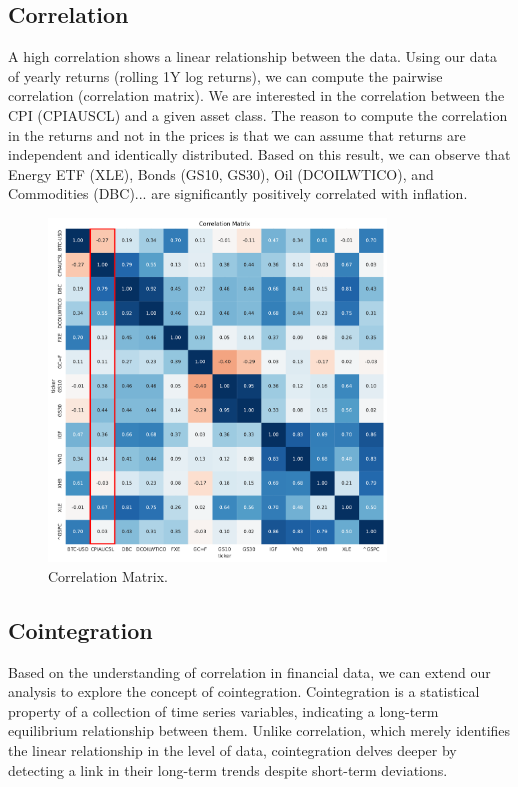 \documentclass{article}
\begin{document}
\subsection{Correlation}

A high correlation shows a linear relationship between the data. Using our data of yearly returns (rolling 1Y log returns), we can compute the pairwise correlation (correlation matrix). We are interested in the correlation between the CPI (CPIAUSCL) and a given asset class. The reason to compute the correlation in the returns and not in the prices is that we can assume that returns are independent and identically distributed. Based on this result, we can observe that Energy ETF (XLE), Bonds (GS10, GS30), Oil (DCOILWTICO), and Commodities (DBC)... are significantly positively correlated with inflation.

\begin{figure}[H]
    \centering
    \includegraphics[width=0.8\textwidth]{figure/Correlation_Matrix.pdf}
    \caption{Correlation Matrix.}
    \label{fig:mesh1}
\end{figure}

\subsection{Cointegration}

Based on the understanding of correlation in financial data, we can extend our analysis to explore the concept of cointegration. Cointegration is a statistical property of a collection of time series variables, indicating a long-term equilibrium relationship between them. Unlike correlation, which merely identifies the linear relationship in the level of data, cointegration delves deeper by detecting a link in their long-term trends despite short-term deviations.
\end{document}
